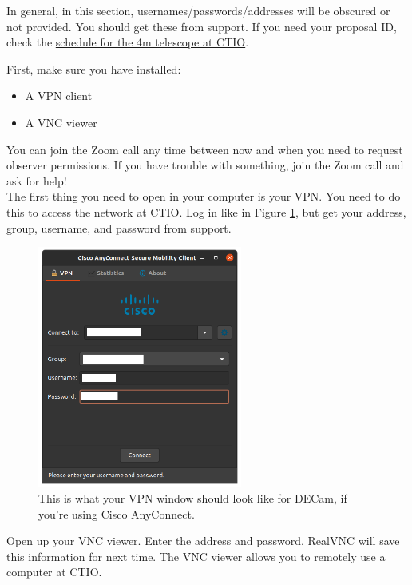 In general, in this section, usernames/passwords/addresses will be obscured or not provided. You should get these from support. If you need your proposal ID, check the \href{https://noirlab.edu/science/observing-noirlab/scheduling/mso-telescopes}{schedule for the 4m telescope at CTIO}. 

First, make sure you have installed:
\begin{itemize}
    \item A VPN client
    \item A VNC viewer
\end{itemize}

You can join the Zoom call any time between now and when you need to request observer permissions. If you have trouble with something, join the Zoom call and ask for help! \\

The first thing you need to open in your computer is your VPN. You need to do this to access the network at CTIO. Log in like in Figure \ref{fig:vpn}, but get your address, group, username, and password from support. \\

\begin{figure}[h!]
    \centering
    \includegraphics[width=0.6\textwidth]{figs/observing/vpn.png}
    \caption{This is what your VPN window should look like for DECam, if you're using Cisco AnyConnect.}
    \label{fig:vpn}
\end{figure}

Open up your VNC viewer. Enter the address and password. RealVNC will save this information for next time. The VNC viewer allows you to remotely use a computer at CTIO. \\

